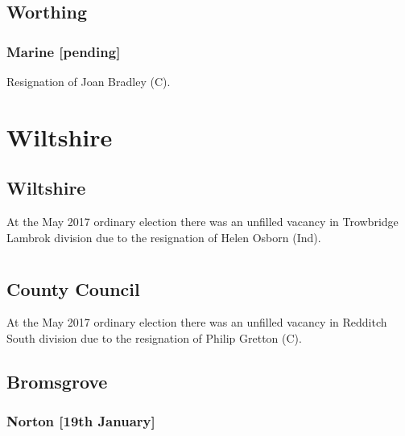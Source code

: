 \documentclass[a4paper,openany]{book}
\begin{document}
\begin{resultsiii}
\subsection*{Worthing}

\subsubsection*{Marine \hspace*{\fill}\nolinebreak[1]%
\enspace\hspace*{\fill}
[pending]}


Resignation of Joan Bradley (C).

\section{Wiltshire}

\subsection*{Wiltshire}

At the May 2017 ordinary election there was an unfilled vacancy in Trowbridge Lambrok division due to the resignation of Helen Osborn (Ind).

\section[Worcestershire]{}

\subsection*{County Council}

At the May 2017 ordinary election there was an unfilled vacancy in Redditch South division due to the resignation of Philip Gretton (C).

\subsection*{Bromsgrove}

\subsubsection*{Norton \hspace*{\fill}\nolinebreak[1]%
\enspace\hspace*{\fill}
[19th January]}


\end{resultsiii}
\end{document}
